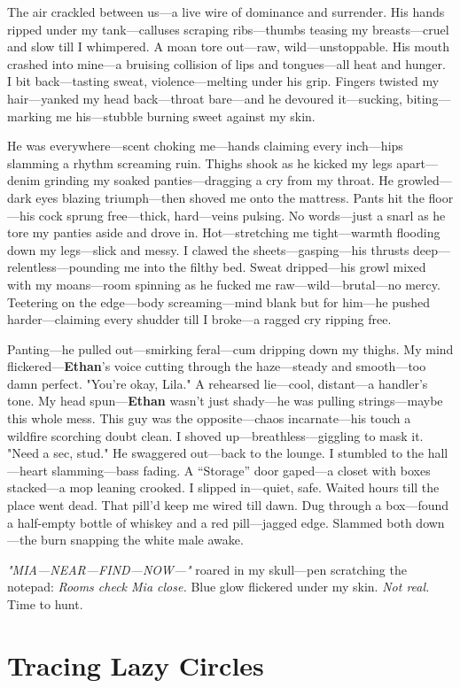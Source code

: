 \documentclass{article}
\begin{document}
The air crackled between us—a live wire of dominance and surrender. His hands ripped under my tank—calluses scraping ribs—thumbs teasing my breasts—cruel and slow till I whimpered. A moan tore out—raw, wild—unstoppable. His mouth crashed into mine—a bruising collision of lips and tongues—all heat and hunger. I bit back—tasting sweat, violence—melting under his grip. Fingers twisted my hair—yanked my head back—throat bare—and he devoured it—sucking, biting—marking me his—stubble burning sweet against my skin.

He was everywhere—scent choking me—hands claiming every inch—hips slamming a rhythm screaming ruin. Thighs shook as he kicked my legs apart—denim grinding my soaked panties—dragging a cry from my throat. He growled—dark eyes blazing triumph—then shoved me onto the mattress. Pants hit the floor—his cock sprung free—thick, hard—veins pulsing. No words—just a snarl as he tore my panties aside and drove in. Hot—stretching me tight—warmth flooding down my legs—slick and messy. I clawed the sheets—gasping—his thrusts deep—relentless—pounding me into the filthy bed. Sweat dripped—his growl mixed with my moans—room spinning as he fucked me raw—wild—brutal—no mercy. Teetering on the edge—body screaming—mind blank but for him—he pushed harder—claiming every shudder till I broke—a ragged cry ripping free.

Panting—he pulled out—smirking feral—cum dripping down my thighs. My mind flickered—\textbf{Ethan}’s voice cutting through the haze—steady and smooth—too damn perfect. "You’re okay, Lila." A rehearsed lie—cool, distant—a handler’s tone. My head spun—\textbf{Ethan} wasn’t just shady—he was pulling strings—maybe this whole mess. This guy was the opposite—chaos incarnate—his touch a wildfire scorching doubt clean. I shoved up—breathless—giggling to mask it. "Need a sec, stud." He swaggered out—back to the lounge. I stumbled to the hall—heart slamming—bass fading. A “Storage” door gaped—a closet with boxes stacked—a mop leaning crooked. I slipped in—quiet, safe. Waited hours till the place went dead. That pill’d keep me wired till dawn. Dug through a box—found a half-empty bottle of whiskey and a red pill—jagged edge. Slammed both down—the burn snapping the white male awake.

\textit{"MIA—NEAR—FIND—NOW—"} roared in my skull—pen scratching the notepad: \textit{Rooms check Mia close.} Blue glow flickered under my skin. \textit{Not real.} Time to hunt.

\section*{Tracing Lazy Circles}
\end{document}
